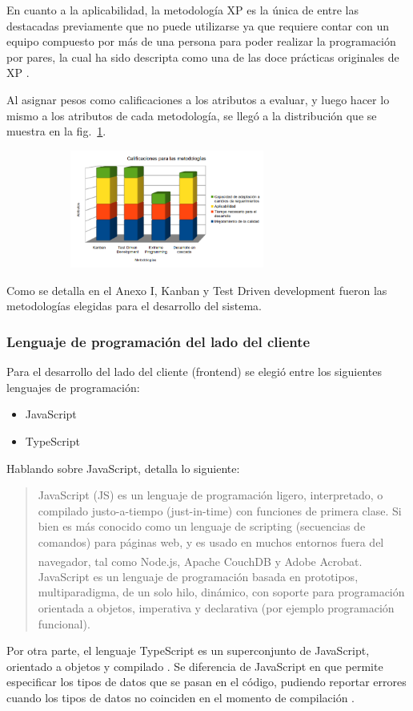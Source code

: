 \documentclass[twoside]{article}
\begin{document}
En cuanto a la aplicabilidad, la metodología XP es la única de entre las destacadas previamente que no puede utilizarse ya que requiere contar con un equipo compuesto por más de una persona para poder realizar la programación por pares, la cual ha sido descripta como una de las doce prácticas originales de XP \parencite{agileAlliance}.

Al asignar pesos como calificaciones a los atributos a evaluar, y luego hacer lo mismo a los atributos de cada metodología, se llegó a la distribución que se muestra en la fig.~\ref{fig:metodologias}.
\begin{figure}[H]
	\caption{Gráfico de calificaciones para metodologías}
    \begin{subfigure}{1\textwidth}
	\includegraphics[width=0.7\textwidth]{calificaciones para metodologias.png}
    \end{subfigure}
	\label{fig:metodologias}
\end{figure}
\vspace{-1.0\baselineskip}
Como se detalla en el Anexo I, Kanban y Test Driven development fueron las metodologías elegidas para el desarrollo del sistema.
\subsubsection{Lenguaje de programación del lado del cliente}
Para el desarrollo del lado del cliente (frontend) se elegió entre los siguientes lenguajes de programación:
\begin{itemize}
    \item JavaScript
    \item TypeScript
\end{itemize}
Hablando sobre JavaScript, \textcite{mdnJs} detalla lo siguiente:
\blockquote{JavaScript (JS) es un lenguaje de programación ligero, interpretado, o compilado justo-a-tiempo (just-in-time) con funciones de primera clase. Si bien es más conocido como un lenguaje de scripting (secuencias de comandos) para páginas web, y es usado en muchos entornos fuera del navegador, tal como Node.js\textsuperscript{\textregistered}, Apache CouchDB y Adobe Acrobat. JavaScript es un lenguaje de programación basada en prototipos, multiparadigma, de un solo hilo, dinámico, con soporte para programación orientada a objetos, imperativa y declarativa (por ejemplo programación funcional).}
Por otra parte, el lenguaje TypeScript es un superconjunto de JavaScript, orientado a objetos y compilado \parencite{msTs}. Se diferencia de JavaScript en que permite especificar los tipos de datos que se pasan en el código, pudiendo reportar errores cuando los tipos de datos no coinciden en el momento de compilación \parencite{w3schoolsTs}. 
\end{document}
